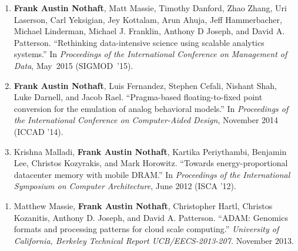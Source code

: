 \documentclass[10pt]{article} %
\newcounter{pubCtr}
\begin{document}
\begin {minipage}[t]{0.2\linewidth}
\vspace{0pt}
\end {minipage}
\begin {minipage}[t]{0.8\linewidth}
\vspace{0pt}


\begin{enumerate}
\setcounter{enumi}{\thepubCtr}
\item {\textbf{Frank Austin Nothaft}, Matt Massie, Timothy Danford, Zhao Zhang,
Uri Laserson, Carl Yeksigian, Jey Kottalam, Arun Ahuja, Jeff Hammerbacher,
Michael Linderman, Michael J. Franklin, Anthony D Joseph, and David A. Patterson.
``Rethinking data-intensive science using scalable analytics systems.'' In
\emph{Proceedings of the International Conference on Management of Data},
May~2015 (SIGMOD~'15).}
\item {\textbf{Frank Austin Nothaft}, Luis Fernandez, Stephen Cefali, Nishant Shah, Luke Darnell,
and Jacob Rael. ``Pragma-based floating-to-fixed point conversion for the emulation of analog
behavioral models.'' In \emph{Proceedings of the International Conference on Computer-Aided Design},
November 2014 (ICCAD '14).}
\item {Krishna Malladi, \textbf{Frank Austin Nothaft}, Kartika Periythambi, Benjamin Lee, 
Christos Kozyrakis, and Mark Horowitz. ``Towards energy-proportional datacenter memory with mobile DRAM.''
In \emph{Proceedings of the International Symposium on Computer Architecture}, June 2012 (ISCA '12).}
\setcounter{pubCtr}{\theenumi}
\end{enumerate}


\begin{enumerate}
\setcounter{enumi}{\thepubCtr}
\item {Matthew Massie, \textbf{Frank Austin Nothaft}, Christopher Hartl, Christos Kozanitis,
Anthony D. Joseph, and David A. Patterson. ``ADAM: Genomics formats and processing patterns
for cloud scale computing.'' \emph{University of California, Berkeley Technical Report
UCB/EECS-2013-207.} November 2013.}
\setcounter{pubCtr}{\theenumi}
\end{enumerate}



\end{minipage}
\end{document}
